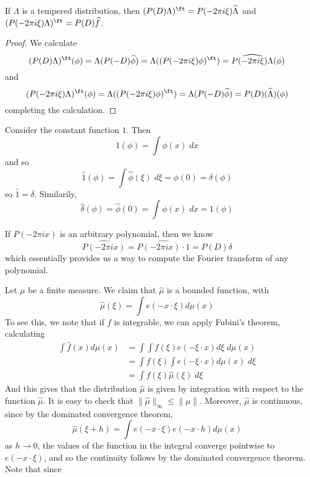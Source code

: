 \begin{theorem}
	If $\Lambda$ is a tempered distribution, then $(P(D) \Lambda)^\ft = P(-2 \pi i \xi) \widehat{\Lambda}$ and $(P(-2 \pi i \xi) \Lambda)^\ft = P(D) \widehat{f}$.
\end{theorem}
\begin{proof}
	We calculate
	\[ (P(D) \Lambda)^\ft(\phi) = \Lambda (P(-D) \widehat{\phi}) = \Lambda((P(-2\pi i \xi) \phi)^\ft) = \widehat{P(- 2 \pi i \xi) \Lambda}(\phi) \]
	and
	\[ (P(-2 \pi i \xi) \Lambda)^\ft(\phi) = \Lambda((P(- 2 \pi i \xi) \phi)^\ft) = \Lambda(P(-D) \widehat{\phi}) = P(D)(\widehat{\Lambda})(\phi) \]
	completing the calculation.
\end{proof}

\begin{example}
	Consider the constant function $1$. Then
	\[ 1(\phi) = \int \phi(x)\; dx \]
	and so
	\[ \widehat{1}(\phi) = \int \widehat{\phi}(\xi)\; d\xi = \phi(0) = \delta(\phi) \]
	so $\widehat{1} = \delta$. Similarily,
	\[ \widehat{\delta}(\phi) = \widehat{\phi}(0) = \int \phi(x)\; dx = 1(\phi) \]
\end{example}

\begin{example}
	If $P(- 2 \pi i x)$ is an arbitrary polynomial, then we know
	\[ \widehat{P(-2 \pi i x)} = \widehat{P(- 2 \pi i x) \cdot 1} = P(D) \delta \]
	which essentially provides us a way to compute the Fourier transform of any polynomial.
\end{example}

\begin{example}
	Let $\mu$ be a finite measure. We claim that $\widehat{\mu}$ is a bounded function, with
	\[ \widehat{\mu}(\xi) = \int e(-x \cdot \xi) d\mu(x) \]
	To see this, we note that if $f$ is integrable, we can apply Fubini's theorem, calculating
	\begin{align*}
		\int \widehat{f}(x) d\mu(x) &= \int \int f(\xi) e(- \xi \cdot x) d\xi\; d\mu(x)\\
		&= \int f(\xi) \int e(- \xi \cdot x) d\mu(x)\; d\xi\\
		&= \int f(\xi) \widehat{\mu}(\xi)\; d\xi
	\end{align*}
	And this gives that the distribution $\widehat{\mu}$ is given by integration with respect to the function $\widehat{\mu}$. It is easy to check that $\| \widehat{\mu} \|_\infty \leq \| \mu \|$. Moreover, $\widehat{\mu}$ is continuous, since by the dominated convergence theorem,
	\[ \widehat{\mu}(\xi + h) = \int e(-x \cdot \xi) e(-x \cdot h) d\mu(x) \]
	as $h \to 0$, the values of the function in the integral converge pointwise to $e(-x \cdot \xi)$, and so the continuity follows by the dominated convergence theorem. Note that since 
\end{example}

